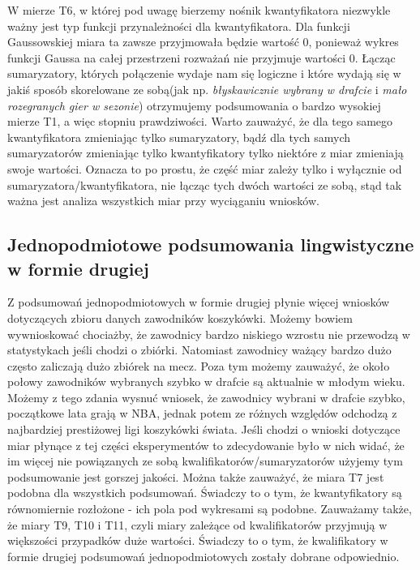 \documentclass{classrep}
\begin{document}
W mierze T6, w której pod uwagę bierzemy nośnik kwantyfikatora niezwykle ważny jest typ funkcji przynależności dla kwantyfikatora. Dla funkcji Gaussowskiej miara ta zawsze przyjmowała będzie wartość 0, ponieważ wykres funkcji Gaussa na całej przestrzeni rozważań nie przyjmuje wartości 0. Łącząc sumaryzatory, których połączenie wydaje nam się logiczne i które wydają się w jakiś sposób skorelowane ze sobą(jak np. \textit{błyskawicznie wybrany w drafcie} i \textit{mało rozegranych gier w sezonie}) otrzymujemy podsumowania o bardzo wysokiej mierze T1, a więc stopniu prawdziwości. Warto zauważyć, że dla tego samego kwantyfikatora zmieniając tylko sumaryzatory, bądź dla tych samych sumaryzatorów zmieniając tylko kwantyfikatory tylko niektóre z miar zmieniają swoje wartości. Oznacza to po prostu, że część miar zależy tylko i wyłącznie od sumaryzatora/kwantyfikatora, nie łącząc tych dwóch wartości ze sobą, stąd tak ważna jest analiza wszystkich miar przy wyciąganiu wniosków.

\subsection{Jednopodmiotowe podsumowania lingwistyczne w formie drugiej}
Z podsumowań jednopodmiotowych w formie drugiej płynie więcej wniosków dotyczących zbioru danych zawodników koszykówki. Możemy bowiem wywnioskować chociażby, że zawodnicy bardzo niskiego wzrostu nie przewodzą w statystykach jeśli chodzi o zbiórki. Natomiast zawodnicy ważący bardzo dużo często zaliczają dużo zbiórek na mecz. Poza tym możemy zauważyć, że około połowy zawodników wybranych szybko w drafcie są aktualnie w młodym wieku. Możemy z tego zdania wysnuć wniosek, że zawodnicy wybrani w drafcie szybko, początkowe lata grają w NBA, jednak potem ze różnych względów odchodzą z najbardziej prestiżowej ligi koszykówki świata. Jeśli chodzi o wnioski dotyczące miar płynące z tej części eksperymentów to zdecydowanie było w nich widać, że im więcej nie powiązanych ze sobą kwalifikatorów/sumaryzatorów użyjemy tym podsumowanie jest gorszej jakości. Można także zauważyć, że miara T7 jest podobna dla wszystkich podsumowań. Świadczy to o tym, że kwantyfikatory są równomiernie rozłożone - ich pola pod wykresami są podobne. Zauważamy także, że miary T9, T10 i T11, czyli miary zależące od kwalifikatorów przyjmują w większości przypadków duże wartości. Świadczy to o tym, że kwalifikatory w formie drugiej podsumowań jednopodmiotowych zostały dobrane odpowiednio.\\
\end{document}
